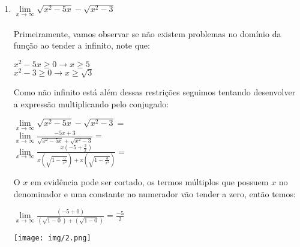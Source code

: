 \documentclass[12pt]{article}
\begin{document}
\begin{enumerate}
\begin{enumerate}
		
		\item $ \lim\limits_{x \rightarrow \infty} \sqrt{x^2 - 5x} - \sqrt{x^2 - 3} $
		\\
		\\
		Primeiramente, vamos observar se não existem problemas no domínio da função ao tender a infinito, note que:\\
		\begin{center}
			$ x^2 - 5x \ge 0 \rightarrow x \ge 5 $\\
			$ x^2 - 3 \ge 0 \rightarrow x \ge \sqrt{3} $\\
		\end{center}
		Como não infinito está além dessas restrições seguimos tentando desenvolver a expressão multiplicando pelo conjugado:\\
		\begin{center}
			$\lim\limits_{x \rightarrow \infty} \sqrt{x^2 - 5x} - \sqrt{x^2 - 3}=$	
			\\		
			$\lim\limits_{x \rightarrow \infty} \frac{-5x + 3}{ \sqrt{x^2 - 5x} + \sqrt{x^2 - 3}} =$
			\\
			$\lim\limits_{x \rightarrow \infty} \frac{x \left(-5 + \frac{3}{x} \right) }{ x \left(\sqrt{1 - \frac{5}{x^2}}\right) + x \left(\sqrt{1 - \frac{3}{x^2}}\right)} =$
			\\
		\end{center}
		O $x$ em evidência pode ser cortado, os termos múltiplos que possuem $x$ no denominador e uma constante no numerador vão tender a zero, então temos:
		\begin{center}
			$\lim\limits_{x \rightarrow \infty} \frac{\left(-5 + 0 \right) }{ \left(\sqrt{1 - 0}\right) + \left(\sqrt{1 - 0}\right)} =
			\frac{-5}{2}$
			\\
		\end{center}	
		
		\begin{center}
			\texttt{[image: img/2.png]}
		\end{center}
		

\end{enumerate}
\end{enumerate}
\end{document}
